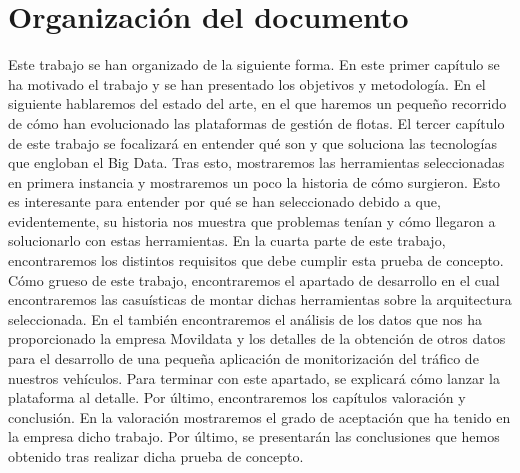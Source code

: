 \section{Organización del documento\label{organizacion}}

Este trabajo se han organizado de la siguiente forma. En este primer
capítulo se ha motivado el trabajo y se han presentado los objetivos y
metodología. En el siguiente hablaremos del estado del arte, en el que
haremos un pequeño recorrido de cómo han evolucionado las plataformas
de gestión de flotas. El tercer capítulo de este trabajo se focalizará
en entender qué son y que soluciona las tecnologías que engloban el
Big Data. Tras esto, mostraremos las herramientas seleccionadas en
primera instancia y mostraremos un poco la historia de cómo surgieron.
Esto es interesante para entender por qué se han seleccionado debido
a que, evidentemente, su historia nos muestra que problemas tenían y
cómo llegaron a solucionarlo con estas herramientas. En la cuarta
parte de este trabajo, encontraremos los distintos requisitos que debe
cumplir esta prueba de concepto. Cómo grueso de este trabajo,
encontraremos el apartado de desarrollo en el cual encontraremos las
casuísticas de montar dichas herramientas sobre la arquitectura
seleccionada. En el también encontraremos el análisis de los datos que
nos ha proporcionado la empresa Movildata y los detalles de la
obtención de otros datos para el desarrollo de una pequeña aplicación
de monitorización del tráfico de nuestros vehículos. Para terminar con
este apartado, se explicará cómo lanzar la plataforma al detalle. Por
último, encontraremos los capítulos valoración y conclusión. En la
valoración mostraremos el grado de aceptación que ha tenido en la
empresa dicho trabajo. Por último, se presentarán las conclusiones que
hemos obtenido tras realizar dicha prueba de concepto.


